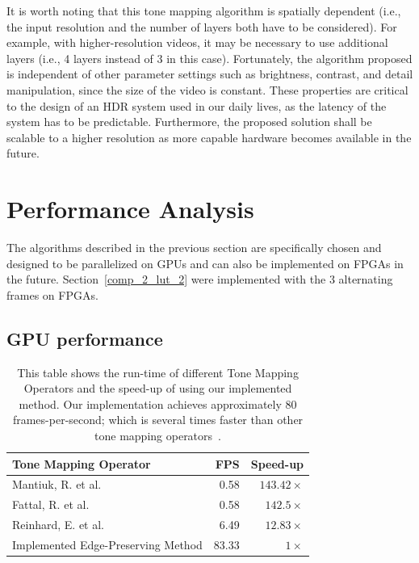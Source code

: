 It is worth noting that this tone mapping algorithm is spatially dependent (i.e., the input resolution and 
the number of layers both have to be considered). For example, with higher-resolution videos, it may 
be necessary to use additional layers (i.e., 4 layers instead of 3 in this case). Fortunately, the 
algorithm proposed is independent of other parameter settings such as brightness, contrast, and 
detail manipulation, since the size of the video is constant. These properties are critical to the design 
of an HDR system used in our daily lives, as the latency of the system has to be predictable. 
Furthermore, the proposed solution shall be scalable to a higher resolution as more capable 
hardware becomes available in the future.

\section{Performance Analysis}
The algorithms described in the previous section are specifically chosen and designed to be 
parallelized on GPUs and can also be implemented on FPGAs in the future.
Section~\ref{comp_2_lut_2} were implemented with the 3 alternating frames on FPGAs.
\subsection{GPU performance}
\begin{table}[!h]
\center
\begin{tabular}{|l|r|r|}
\hline
\bf{Tone Mapping Operator} & \bf{FPS} & \bf{Speed-up}\\
\hline
Mantiuk, R. et al. \cite{mantiuk2006perceptual}     & 0.58              & $143.42\times$\\
\hline
Fattal, R. et al. \cite{fattal2002gradient}        & 0.58              & $142.5\times$\\
\hline
Reinhard, E. et al. \cite{reinhard2002photographic}     & 6.49              & $12.83\times$\\
\hline
Implemented Edge-Preserving Method          & 83.33             & $1\times$\\
\hline
\end{tabular}
\caption{This table shows the run-time of different Tone Mapping Operators and the speed-up of 
using our implemented method. Our implementation 
achieves approximately 80 frames-per-second; which is several times faster than other tone mapping 
operators~\cite{lo2012high}.}
\label{perf_table}
\end{table}

